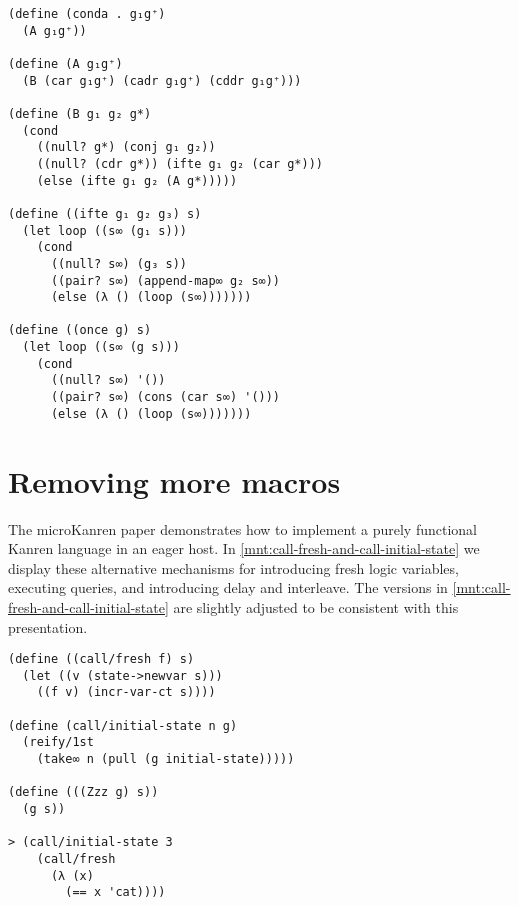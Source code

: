 \documentclass[sigplan,balance=true,pbalance=true,natbib=false]{acmart}
\begin{document}
\begin{listing}[h]
  \begin{verbatim}
(define (conda . g₁g⁺)
  (A g₁g⁺))

(define (A g₁g⁺)
  (B (car g₁g⁺) (cadr g₁g⁺) (cddr g₁g⁺)))

(define (B g₁ g₂ g*)
  (cond
    ((null? g*) (conj g₁ g₂))
    ((null? (cdr g*)) (ifte g₁ g₂ (car g*)))
    (else (ifte g₁ g₂ (A g*)))))

(define ((ifte g₁ g₂ g₃) s)
  (let loop ((s∞ (g₁ s)))
    (cond
      ((null? s∞) (g₃ s))
      ((pair? s∞) (append-map∞ g₂ s∞))
      (else (λ () (loop (s∞)))))))

(define ((once g) s)
  (let loop ((s∞ (g s)))
    (cond
      ((null? s∞) '())
      ((pair? s∞) (cons (car s∞) '()))
      (else (λ () (loop (s∞)))))))
  \end{verbatim}
  \caption{A functional , , and }\label{mnt:conda-implementation}
\end{listing}

\section{Removing more macros}\label{sec:functional}

The \citeyear{hemann2013muKanren} microKanren paper demonstrates how
to implement a purely functional Kanren language in an eager host. In
\cref{mnt:call-fresh-and-call-initial-state} we display these
alternative mechanisms for introducing fresh logic variables,
executing queries, and introducing delay and interleave. The versions
in \cref{mnt:call-fresh-and-call-initial-state} are slightly adjusted
to be consistent with this presentation.

\begin{listing}
  \begin{verbatim}
(define ((call/fresh f) s)
  (let ((v (state->newvar s)))
    ((f v) (incr-var-ct s))))

(define (call/initial-state n g)
  (reify/1st
    (take∞ n (pull (g initial-state)))))

(define (((Zzz g) s))
  (g s))

> (call/initial-state 3
    (call/fresh
      (λ (x)
        (== x 'cat))))
  \end{verbatim}
  \caption{Definition and use of functional microKanren equivalents of \emph{TRS2e} kernel macros}\label{mnt:call-fresh-and-call-initial-state}
\end{listing}
\end{document}

